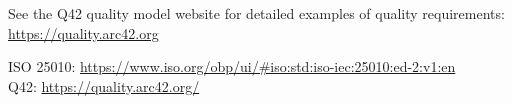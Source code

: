 See the Q42 quality model website for detailed examples of quality requirements:
\href{https://quality.arc42.org/}{https://quality.arc42.org}

ISO 25010: \href{https://www.iso.org/obp/ui/\#iso:std:iso-iec:25010:ed-2:v1:en}{https://www.iso.org/obp/ui/\#iso:std:iso-iec:25010:ed-2:v1:en}\\
Q42: \href{https://quality.arc42.org/}{https://quality.arc42.org/}

